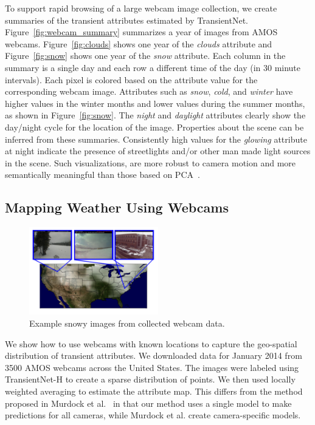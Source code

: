 \documentclass[10pt,twocolumn,letterpaper]{article}
\newcommand{\figref}[1]{Figure~\ref{fig:#1}}
\begin{document}
To support rapid browsing of a large webcam image collection, we create
summaries of the transient attributes estimated by TransientNet.
\figref{webcam_summary} summarizes a year of images from AMOS webcams.
\figref{clouds} shows one year of the \emph{clouds} attribute and \figref{snow}
shows one year of the \emph{snow} attribute.  Each column in the summary is a
single day and each row a different time of the day (in 30 minute intervals).
Each pixel is colored based on the attribute value for the corresponding webcam
image. Attributes such as \textit{snow}, \textit{cold}, and \textit{winter}
have higher values in the winter months and lower values during the summer
months, as shown in \figref{snow}. The \textit{night} and \textit{daylight}
attributes clearly show the day/night cycle for the location of the image.
Properties about the scene can be inferred from these summaries.  Consistently
high values for the \textit{glowing} attribute at night indicate the presence
of streetlights and/or other man made light sources in the scene.  Such
visualizations, are more robust to camera motion and more semantically
meaningful than those based on PCA~\cite{jacobs09webcamdata}.

\subsection{Mapping Weather Using Webcams}

\begin{figure}[t]
	\centering
		\includegraphics[width=0.5\textwidth, trim= 0mm 10mm 0mm 0mm]{figs/snow_exs.pdf}
		\caption{Example snowy images from collected webcam data.}
		\label{fig:snow_exs}
\end{figure}

We show how to use webcams with known locations to capture the geo-spatial
distribution of transient attributes. We downloaded data for January 2014 from
3500 AMOS webcams across the United States.  The images were labeled using
TransientNet-H to create a sparse distribution of points.  We then used locally
weighted averaging to estimate the attribute map.  This differs from the method
proposed in Murdock et al.~\cite{murdock13clouds} in that our method uses a
single model to make predictions for all cameras, while Murdock et al. create
camera-specific models.
\end{document}
